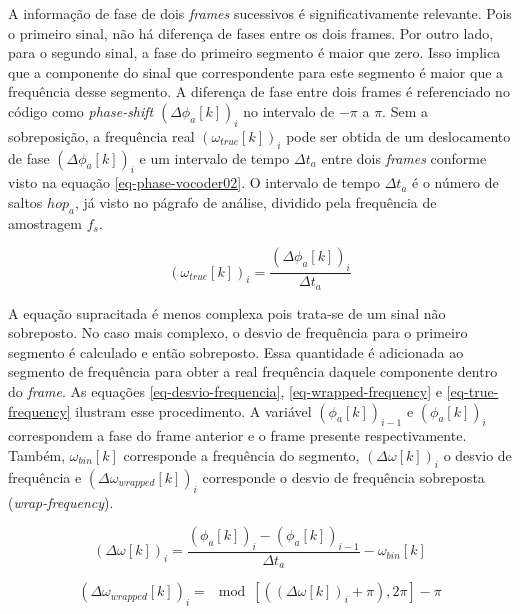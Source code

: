 					A informação de fase de dois \textit{frames} sucessivos é significativamente relevante. Pois o primeiro sinal, não há diferença de fases entre os dois frames. Por outro lado, para o segundo sinal, a fase do primeiro segmento é maior que zero. Isso implica que a componente do sinal que correspondente para este segmento é maior que a frequência desse segmento. A diferença de fase entre dois frames é referenciado no código como \textit{phase-shift} $ (\Delta\phi_a[k])_i $ no intervalo de $ -\pi $ a $ \pi $. Sem a sobreposição, a frequência real $ (\omega_{true}[k])_i $ pode ser obtida de um deslocamento de fase $ (\Delta\phi_a[k])_i $ e um intervalo de tempo $ \Delta t_a $ entre dois \textit{frames} conforme visto na equação \ref{eq-phase-vocoder02}. O intervalo de tempo $ \Delta t_a $ é o número de saltos $hop_a$, já visto no págrafo de análise, dividido pela frequência de amostragem $ f_s $.
					
					\begin{equation}
						\label{eq-phase-vocoder02}
						(\omega_{true}[k])_i = \frac{(\Delta\phi_a[k])_i}{\Delta t_a}
					\end{equation}
					
					A equação supracitada é menos complexa pois trata-se de um sinal não sobreposto. No caso mais complexo, o desvio de frequência para o primeiro segmento é calculado e então sobreposto. Essa quantidade é adicionada ao segmento de frequência para obter a real frequência daquele componente dentro do \textit{frame}. As equações \ref{eq-desvio-frequencia}, \ref{eq-wrapped-frequency} e \ref{eq-true-frequency} ilustram esse procedimento. A variável $(\phi_a[k])_{i-1}$ e $(\phi_a[k])_i$ correspondem a fase do frame anterior e o frame presente respectivamente. Também, $ \omega_{bin}[k] $ corresponde a frequência do segmento, $ (\Delta\omega[k])_i $ o desvio de frequência e $ (\Delta\omega_{wrapped}[k])_i $ corresponde o desvio de frequência sobreposta (\textit{wrap-frequency}).
					
					\begin{equation}
						\label{eq-desvio-frequencia}
						(\Delta\omega[k])_i = \frac{(\phi_a[k])_i - (\phi_a[k])_{i-1}}{\Delta t_a} - \omega_{bin}[k]
					\end{equation}
					
					\begin{equation}
						\label{eq-wrapped-frequency}
						(\Delta\omega_{wrapped}[k])_i = \mod[((\Delta\omega[k])_i+\pi),2\pi]-\pi
					\end{equation}
					
